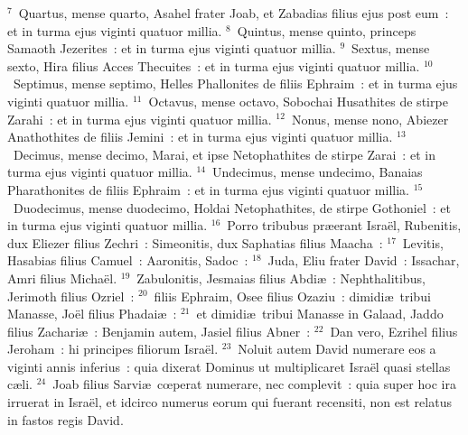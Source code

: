 ${}^{7}$~Quartus, mense quarto, Asahel frater Joab, et Zabadias filius ejus post eum~: et in turma ejus viginti quatuor millia.
${}^{8}$~Quintus, mense quinto, princeps Samaoth Jezerites~: et in turma ejus viginti quatuor millia.
${}^{9}$~Sextus, mense sexto, Hira filius Acces Thecuites~: et in turma ejus viginti quatuor millia.
${}^{10}$~Septimus, mense septimo, Helles Phallonites de filiis Ephraim~: et in turma ejus viginti quatuor millia.
${}^{11}$~Octavus, mense octavo, Sobochai Husathites de stirpe Zarahi~: et in turma ejus viginti quatuor millia.
${}^{12}$~Nonus, mense nono, Abiezer Anathothites de filiis Jemini~: et in turma ejus viginti quatuor millia.
${}^{13}$~Decimus, mense decimo, Marai, et ipse Netophathites de stirpe Zarai~: et in turma ejus viginti quatuor millia.
${}^{14}$~Undecimus, mense undecimo, Banaias Pharathonites de filiis Ephraim~: et in turma ejus viginti quatuor millia.
${}^{15}$~Duodecimus, mense duodecimo, Holdai Netophathites, de stirpe Gothoniel~: et in turma ejus viginti quatuor millia.
${}^{16}$~Porro tribubus pr\ae erant Isra\"el, Rubenitis, dux Eliezer filius Zechri~: Simeonitis, dux Saphatias filius Maacha~:
${}^{17}$~Levitis, Hasabias filius Camuel~: Aaronitis, Sadoc~:
${}^{18}$~Juda, Eliu frater David~: Issachar, Amri filius Micha\"el.
${}^{19}$~Zabulonitis, Jesmaias filius Abdi\ae~: Nephthalitibus, Jerimoth filius Ozriel~:
${}^{20}$~filiis Ephraim, Osee filius Ozaziu~: dimidi\ae\ tribui Manasse, Jo\"el filius Phadai\ae~:
${}^{21}$~et dimidi\ae\ tribui Manasse in Galaad, Jaddo filius Zachari\ae~: Benjamin autem, Jasiel filius Abner~:
${}^{22}$~Dan vero, Ezrihel filius Jeroham~: hi principes filiorum Isra\"el.
${}^{23}$~Noluit autem David numerare eos a viginti annis inferius~: quia dixerat Dominus ut multiplicaret Isra\"el quasi stellas c\ae li.
${}^{24}$~Joab filius Sarvi\ae\ cœperat numerare, nec complevit~: quia super hoc ira irruerat in Isra\"el, et idcirco numerus eorum qui fuerant recensiti, non est relatus in fastos regis David.


